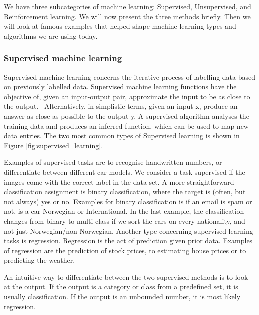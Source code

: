 We have three subcategories of machine learning: Supervised, Unsupervised, and Reinforcement learning. 
We will now present the three methods briefly. Then we will look at famous examples that helped shape machine learning types and algorithms we are using today.

\subsubsection{Supervised machine learning}
Supervised machine learning concerns the iterative process of labelling data based on previously labelled data.  Supervised machine learning functions have the objective of, given an input-output pair, approximate the input to be as close to the output.~\cite{AI:ModernApproach} Alternatively, in simplistic terms, given an input x, produce an answer as close as possible to the output y.
A supervised algorithm analyses the training data and produces an inferred function, which can be used to map new data entries. The two most common types of Supervised learning is shown in Figure \ref{fig:supervised_learning}.


Examples of supervised tasks are to recognise handwritten numbers, or differentiate between different car models. We consider a task supervised if the images come with the correct label in the data set. 
A more straightforward classification assignment is binary classification, where the target is (often, but not always) yes or no. Examples for binary classification is if an email is spam or not, is a car Norwegian or International. In the last example, the classification changes from binary to multi-class if we sort the cars on every nationality, and not just Norwegian/non-Norwegian. Another type concerning supervised learning tasks is regression. Regression is the act of prediction given prior data. Examples of regression are the prediction of stock prices, to estimating house prices or to predicting the weather.

An intuitive way to differentiate between the two supervised methods is to look at the output. If the output is a category or class from a predefined set, it is usually classification. If the output is an unbounded number, it is most likely regression. 
  
